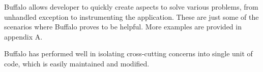 Buffalo allows developer to quickly create aspects to solve various problems, from unhandled exception to instrumenting the application. These are just some of the scenarios where Buffalo proves to be helpful. More examples are provided in appendix A. 

Buffalo has performed well in isolating cross-cutting concerns into single unit of code, which is easily maintained and modified.
